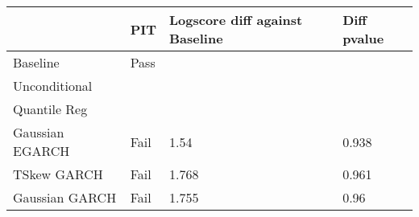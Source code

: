 \begin{tabular}{llll}
\toprule
{} &   PIT & Logscore diff against Baseline & Diff pvalue \\
\midrule
Baseline        &  Pass &                                &             \\
Unconditional   &       &                                &             \\
Quantile Reg    &       &                                &             \\
Gaussian EGARCH &  Fail &                           1.54 &       0.938 \\
TSkew GARCH     &  Fail &                          1.768 &       0.961 \\
Gaussian GARCH  &  Fail &                          1.755 &        0.96 \\
\bottomrule
\end{tabular}
